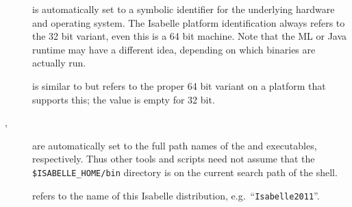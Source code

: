 \begin{isabellebody}
\begin{isamarkuptext}
\begin{description}
  \item[\hypertarget{setting.ISABELLE-PLATFORM}{\hyperlink{setting.ISABELLE-PLATFORM}{\mbox{}}}] is automatically
  set to a symbolic identifier for the underlying hardware and
  operating system.  The Isabelle platform identification always
  refers to the 32 bit variant, even this is a 64 bit machine.  Note
  that the ML or Java runtime may have a different idea, depending on
  which binaries are actually run.

  \item[\hypertarget{setting.ISABELLE-PLATFORM64}{\hyperlink{setting.ISABELLE-PLATFORM64}{\mbox{}}}] is similar to
  \hyperlink{setting.ISABELLE-PLATFORM}{\mbox{}} but refers to the proper 64 bit variant
  on a platform that supports this; the value is empty for 32 bit.

  \item[\hypertarget{setting.ISABELLE-PROCESS}{\hyperlink{setting.ISABELLE-PROCESS}{\mbox{}}}, \hyperlink{setting.ISABELLE-TOOL}{\mbox{}}] are automatically set to the full path
  names of the \hyperlink{executable.isabelle-process}{\mbox{}} and \hyperlink{executable.isabelle}{\mbox{}} executables, respectively.  Thus other tools and scripts
  need not assume that the \verb|$ISABELLE_HOME/bin| directory is
  on the current search path of the shell.
  
  \item[\hypertarget{setting.ISABELLE-IDENTIFIER}{\hyperlink{setting.ISABELLE-IDENTIFIER}{\mbox{}}}] refers
  to the name of this Isabelle distribution, e.g.\ ``\verb|Isabelle2011|''.


\end{description}
\end{isamarkuptext}
\end{isabellebody}
